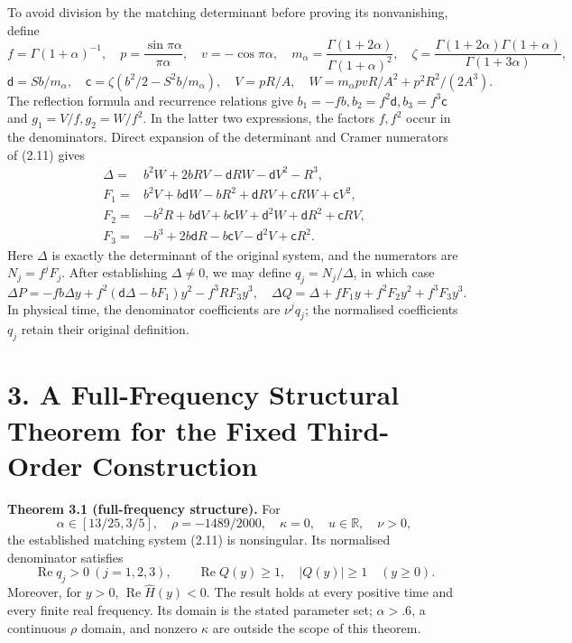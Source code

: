 \documentclass[a4paper,11pt]{article}
\begin{document}
To avoid division by the matching determinant before proving its nonvanishing, define
\[
f=\Gamma(1+\alpha)^{-1},\quad p=\frac{\sin\pi\alpha}{\pi\alpha},
\quad v=-\cos\pi\alpha,\quad
m_\alpha=\frac{\Gamma(1+2\alpha)}{\Gamma(1+\alpha)^2},\quad
\zeta=\frac{\Gamma(1+2\alpha)\Gamma(1+\alpha)}{\Gamma(1+3\alpha)},
\]
\[
\mathsf d=Sb/m_\alpha,\quad
\mathsf c=\zeta(b^2/2-S^2b/m_\alpha),\quad
V=pR/A,\quad W=m_\alpha p v R/A^2+p^2R^2/(2A^3).
\tag{2.12}
\]
The reflection formula and recurrence relations give \(b_1=-fb,b_2=f^2\mathsf d,b_3=f^3\mathsf c\) and \(g_1=V/f,g_2=W/f^2\). In the latter two expressions, the factors \(f,f^2\) occur in the denominators. Direct expansion of the determinant and Cramer numerators of (2.11) gives
\[
\begin{aligned}
\Delta={}&b^2W+2bRV-\mathsf dRW-\mathsf dV^2-R^3,\\
F_1={}&b^2V+b\mathsf dW-bR^2+\mathsf dRV+\mathsf cRW+\mathsf cV^2,\\
F_2={}&-b^2R+b\mathsf dV+b\mathsf cW+\mathsf d^2W+\mathsf dR^2+\mathsf cRV,\\
F_3={}&-b^3+2b\mathsf dR-b\mathsf cV-\mathsf d^2V+\mathsf cR^2.
\end{aligned}
\tag{2.13}
\]
Here \(\Delta\) is exactly the determinant of the original system, and the numerators are \(N_j=f^jF_j\). After establishing \(\Delta\ne0\), we may define \(q_j=N_j/\Delta\), in which case
\[
\Delta P=-fb\Delta y+f^2(\mathsf d\Delta-bF_1)y^2-f^3RF_3y^3,\quad
\Delta Q=\Delta+fF_1y+f^2F_2y^2+f^3F_3y^3.
\tag{2.14}
\]
In physical time, the denominator coefficients are \(\nu^jq_j\); the normalised coefficients \(q_j\) retain their original definition.

\section*{3. A Full-Frequency Structural Theorem for the Fixed Third-Order Construction}

\textbf{Theorem 3.1 (full-frequency structure).} For
\[
\alpha\in[13/25,3/5],\quad \rho=-1489/2000,\quad \kappa=0,\quad
u\in\mathbb R,\quad \nu>0,
\tag{3.1}
\]
the established matching system (2.11) is nonsingular. Its normalised denominator satisfies
\[
\operatorname{Re}q_j>0\ (j=1,2,3),\qquad
\operatorname{Re}Q(y)\ge1,\quad |Q(y)|\ge1\quad(y\ge0).
\tag{3.2}
\]
Moreover, for \(y>0\), \(\operatorname{Re}\widehat H(y)<0\). The result holds at every positive time and every finite real frequency. Its domain is the stated parameter set; \(\alpha>.6\), a continuous \(\rho\) domain, and nonzero \(\kappa\) are outside the scope of this theorem.
\end{document}
